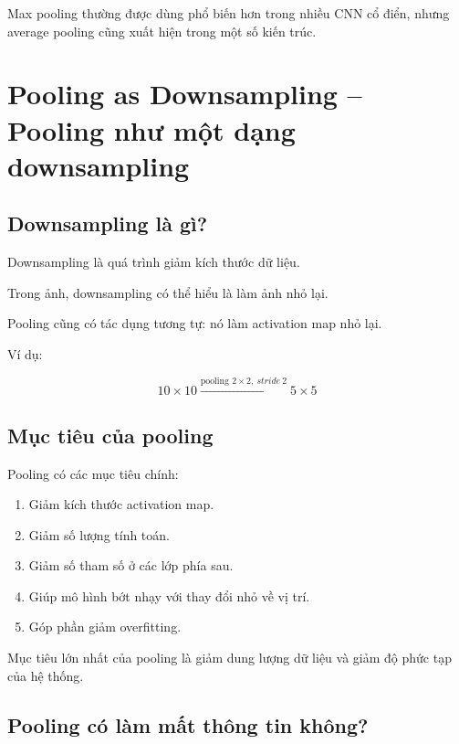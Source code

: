 \begin{luuy}
Max pooling thường được dùng phổ biến hơn trong nhiều CNN cổ điển, nhưng average pooling cũng xuất hiện trong một số kiến trúc.
\end{luuy}

\section{Pooling as Downsampling -- Pooling như một dạng downsampling}

\subsection{Downsampling là gì?}

Downsampling là quá trình giảm kích thước dữ liệu.

Trong ảnh, downsampling có thể hiểu là làm ảnh nhỏ lại.

Pooling cũng có tác dụng tương tự: nó làm activation map nhỏ lại.

Ví dụ:

\[
    10\times10
    \xrightarrow{\text{pooling }2\times2,\ stride\ 2}
    5\times5
\]

\subsection{Mục tiêu của pooling}

Pooling có các mục tiêu chính:

\begin{enumerate}[label=\arabic*.]
    \item Giảm kích thước activation map.
    \item Giảm số lượng tính toán.
    \item Giảm số tham số ở các lớp phía sau.
    \item Giúp mô hình bớt nhạy với thay đổi nhỏ về vị trí.
    \item Góp phần giảm overfitting.
\end{enumerate}

\begin{ghinho}
Mục tiêu lớn nhất của pooling là giảm dung lượng dữ liệu và giảm độ phức tạp của hệ thống.
\end{ghinho}

\subsection{Pooling có làm mất thông tin không?}

